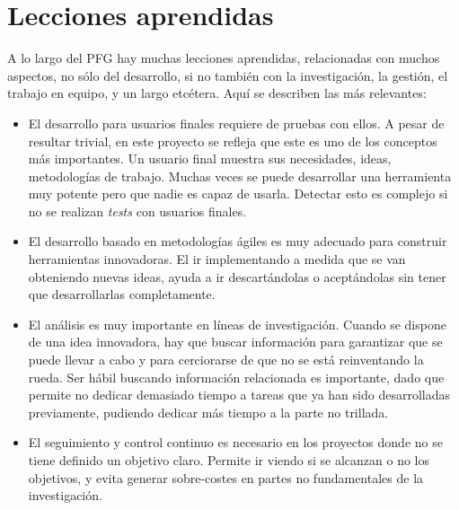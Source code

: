 \section{Lecciones aprendidas}
\label{sec:Lecciones}

A lo largo del PFG hay muchas lecciones aprendidas, relacionadas con muchos aspectos, no sólo del desarrollo, si no también con la investigación, la gestión, el trabajo en equipo, y un largo etcétera. Aquí se describen las más relevantes:

\begin{itemize}
\item{El desarrollo para usuarios finales requiere de pruebas con ellos. A pesar de resultar trivial, en este proyecto se refleja que este es uno de los conceptos más importantes. Un usuario final muestra sus necesidades, ideas, metodologías de trabajo. Muchas veces se puede desarrollar una herramienta muy potente pero que nadie es capaz de usarla. Detectar esto es complejo si no se realizan \emph{tests} con usuarios finales.}
\item{El desarrollo basado en metodologías ágiles es muy adecuado para construir herramientas innovadoras. El ir implementando a medida que se van obteniendo nuevas ideas, ayuda a ir descartándolas o aceptándolas sin tener que desarrollarlas completamente.}
\item{El análisis es muy importante en líneas de investigación. Cuando se dispone de una idea innovadora, hay que buscar información para garantizar que se puede llevar a cabo y para cerciorarse de que no se está reinventando la rueda. Ser hábil buscando información relacionada es importante, dado que permite no dedicar demasiado tiempo a tareas que ya han sido desarrolladas previamente, pudiendo dedicar más tiempo a la parte no trillada.}
\item{El seguimiento y control continuo es necesario en los proyectos donde no se tiene definido un objetivo claro. Permite ir viendo si se alcanzan o no los objetivos, y evita generar sobre-costes en partes no fundamentales de la investigación.}
\end{itemize}